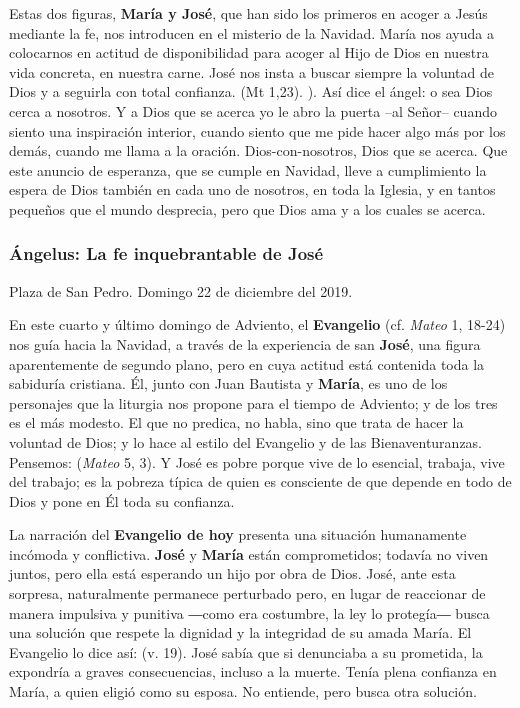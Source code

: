 Estas dos figuras, \textbf{María y José}, que han sido los primeros en acoger a Jesús mediante la fe, nos introducen en el misterio de la Navidad. María nos ayuda a colocarnos en actitud de disponibilidad para acoger al Hijo de Dios en nuestra vida concreta, en nuestra carne. José nos insta a buscar siempre la voluntad de Dios y a seguirla con total confianza.  (Mt 1,23). ). Así dice el ángel:  o sea Dios cerca a nosotros. Y a Dios que se acerca yo le abro la puerta --al Señor-- cuando siento una inspiración interior, cuando siento que me pide hacer algo más por los demás, cuando me llama a la oración. Dios-con-nosotros, Dios que se acerca. Que este anuncio de esperanza, que se cumple en Navidad, lleve a cumplimiento la espera de Dios también en cada uno de nosotros, en toda la Iglesia, y en tantos pequeños que el mundo desprecia, pero que Dios ama y a los cuales se acerca.

\subsubsection{Ángelus: La fe inquebrantable de José}

Plaza de San Pedro. Domingo 22 de diciembre del 2019.

En este cuarto y último domingo de Adviento, el \textbf{Evangelio} (cf. \emph{Mateo} 1, 18-24) nos guía hacia la Navidad, a través de la experiencia de san \textbf{José}, una figura aparentemente de segundo plano, pero en cuya actitud está contenida toda la sabiduría cristiana. Él, junto con Juan Bautista y \textbf{María}, es uno de los personajes que la liturgia nos propone para el tiempo de Adviento; y de los tres es el más modesto. El que no predica, no habla, sino que trata de hacer la voluntad de Dios; y lo hace al estilo del Evangelio y de las Bienaventuranzas. Pensemos:  (\emph{Mateo} 5, 3). Y José es pobre porque vive de lo esencial, trabaja, vive del trabajo; es la pobreza típica de quien es consciente de que depende en todo de Dios y pone en Él toda su confianza.

La narración del \textbf{Evangelio de hoy} presenta una situación humanamente incómoda y conflictiva. \textbf{José} y \textbf{María} están comprometidos; todavía no viven juntos, pero ella está esperando un hijo por obra de Dios. José, ante esta sorpresa, naturalmente permanece perturbado pero, en lugar de reaccionar de manera impulsiva y punitiva ―como era costumbre, la ley lo protegía― busca una solución que respete la dignidad y la integridad de su amada María. El Evangelio lo dice así:  (v. 19). José sabía que si denunciaba a su prometida, la expondría a graves consecuencias, incluso a la muerte. Tenía plena confianza en María, a quien eligió como su esposa. No entiende, pero busca otra solución.

